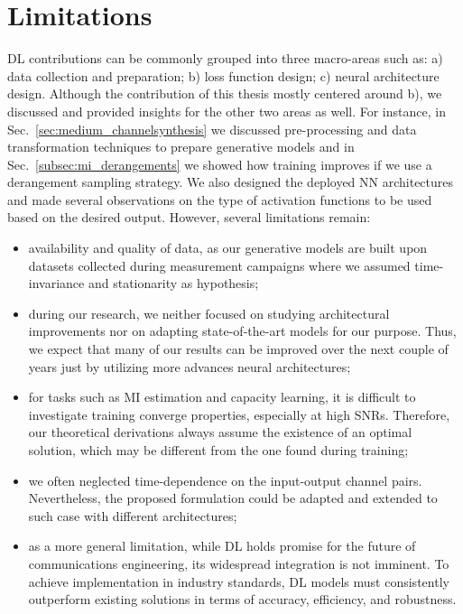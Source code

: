 \section*{Limitations}
DL contributions can be commonly grouped into three macro-areas such as: a) data collection and preparation; b) loss function design; c) neural architecture design.
Although the contribution of this thesis mostly centered around b), we discussed and provided insights for the other two areas as well. For instance, in Sec.~\ref{sec:medium_channelsynthesis} we discussed pre-processing and data transformation techniques to prepare generative models and in Sec.~\ref{subsec:mi_derangements} we showed how  training improves if we use a derangement sampling strategy. We also designed the deployed NN architectures and made several observations on the type of activation functions to be used based on the desired output. However, several limitations remain:
\begin{itemize}
    \item availability and quality of data, as our generative models are built upon datasets collected during measurement campaigns where we assumed time-invariance and stationarity as hypothesis; 
    \item during our research, we neither focused on studying architectural improvements nor on adapting state-of-the-art models for our purpose. Thus, we expect that many of our results can be improved over the next couple of years just by utilizing more advances neural architectures;
    \item for tasks such as MI estimation and capacity learning, it is difficult to investigate training converge properties, especially at high SNRs. Therefore, our theoretical derivations always assume the existence of an optimal solution, which may be different from the one found during training;
    \item we often neglected time-dependence on the input-output channel pairs. Nevertheless, the proposed formulation could be adapted and extended to such case with different architectures;
    \item as a more general limitation, while DL holds promise for the future of communications engineering, its widespread integration is not imminent. To achieve implementation in industry standards, DL models must consistently outperform existing solutions in terms of accuracy, efficiency, and robustness.
\end{itemize}

